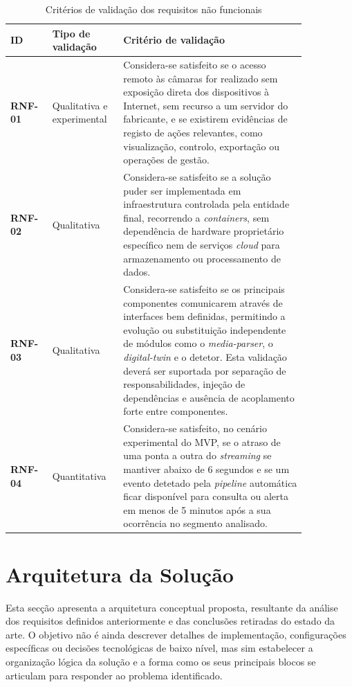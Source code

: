 \begin{table}[H]
    \centering
    \caption{Critérios de validação dos requisitos não funcionais}
    \label{tab:criterios_validacao_rnf}
    \begin{tabular}{p{0.12\linewidth} p{0.18\linewidth} p{0.55\linewidth}}
        \toprule
        \textbf{ID} & \textbf{Tipo de validação} & \textbf{Critério de validação} \\
        \midrule
        \textbf{RNF-01} & Qualitativa e experimental & Considera-se satisfeito se o acesso remoto às câmaras for realizado sem exposição direta dos dispositivos à Internet, sem recurso a um servidor do fabricante, e se existirem evidências de registo de ações relevantes, como visualização, controlo, exportação ou operações de gestão. \\
        \textbf{RNF-02} & Qualitativa & Considera-se satisfeito se a solução puder ser implementada em infraestrutura controlada pela entidade final, recorrendo a \textit{containers}, sem dependência de hardware proprietário específico nem de serviços \textit{cloud} para armazenamento ou processamento de dados. \\
        \textbf{RNF-03} & Qualitativa & Considera-se satisfeito se os principais componentes comunicarem através de interfaces bem definidas, permitindo a evolução ou substituição independente de módulos como o \textit{media-parser}, o \textit{digital-twin} e o detetor. Esta validação deverá ser suportada por separação de responsabilidades, injeção de dependências e ausência de acoplamento forte entre componentes. \\
        \textbf{RNF-04} & Quantitativa & Considera-se satisfeito, no cenário experimental do \gls{MVP}, se o atraso de uma ponta a outra do \textit{streaming} se mantiver abaixo de 6 segundos e se um evento detetado pela \textit{pipeline} automática ficar disponível para consulta ou alerta em menos de 5 minutos após a sua ocorrência no segmento analisado. \\
        \bottomrule
    \end{tabular}
\end{table}

\section{Arquitetura da Solução}

Esta secção apresenta a arquitetura conceptual proposta, resultante da análise dos requisitos definidos anteriormente e das conclusões retiradas do estado da arte. O objetivo não é ainda descrever detalhes de implementação, configurações específicas ou decisões tecnológicas de baixo nível, mas sim estabelecer a organização lógica da solução e a forma como os seus principais blocos se articulam para responder ao problema identificado.

